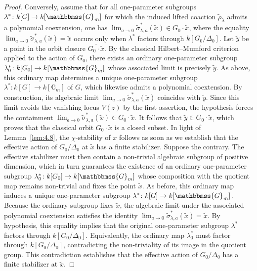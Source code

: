 \documentclass[11pt,a4paper,reqno,noamsfonts]{amsart}
\numberwithin{equation}{section}
\theoremstyle{definition}
\theoremstyle{remark}
\newcommand{\GG}{\ensuremath{\mathbbmss{G}}}
\begin{document}
\begin{proof}
Conversely, assume that for all one-parameter subgroups $\lambda^* \colon k[G] \to k[\GG_m]$ for which the induced lifted coaction $\tilde{\rho}_{\lambda}$ admits a polynomial coextension, one has $\displaystyle \lim_{a \to 0} \tilde{\sigma}_{\lambda,a}^*(\tilde{x}) \in G_0 \cdot \tilde{x}$, where the equality $\displaystyle \lim_{a \to 0} \tilde{\sigma}_{\lambda,a}^*(\tilde{x}) = \tilde{x}$ occurs only when $\lambda^*$ factors through $k[G_0/\Delta_0]$. Let $\tilde{y}$ be a point in the orbit closure $\overline{G_0 \cdot \tilde{x}}$. By the classical Hilbert--Mumford criterion applied to the action of $G_0$, there exists an ordinary one-parameter subgroup $\lambda_0^* \colon k[G_0] \to k[\GG_m]$ whose associated limit is precisely $\tilde{y}$. As above, this ordinary map determines a unique one-parameter subgroup $\lambda^* \colon k[G] \to k[\mathbb{G}_m]$ of $G$, which likewise admits a polynomial coextension. By construction, its algebraic limit $\displaystyle \lim_{a \to 0} \tilde{\sigma}_{\lambda,a}^*(\tilde{x})$ coincides with $\tilde{y}$. Since this limit avoids the vanishing locus $V(z)$ by the first assertion, the hypothesis forces the containment $\displaystyle \lim_{a \to 0} \tilde{\sigma}_{\lambda,a}^*(\tilde{x}) \in G_0 \cdot \tilde{x}$. It follows that $\tilde{y} \in G_0 \cdot \tilde{x}$, which proves that the classical orbit $G_0 \cdot \tilde{x}$ is a closed subset. In light of Lemma~\ref{lem:4.8}, the $\chi$-stability of $x$ follows as soon as we establish that the effective action of $G_0/\Delta_0$ at $\tilde{x}$ has a finite stabilizer. Suppose the contrary. The effective stabilizer must then contain a non-trivial algebraic subgroup of positive dimension, which in turn guarantees the existence of an ordinary one-parameter subgroup $\lambda_0^* \colon k[G_0] \to k[\GG_m]$ whose composition with the quotient map remains non-trivial and fixes the point $\tilde{x}$. As before, this ordinary map induces a unique one-parameter subgroup $\lambda^* \colon k[G] \to k[\GG_m]$. Because the ordinary subgroup fixes $\tilde{x}$, the algebraic limit under the associated polynomial coextension satisfies the identity $\displaystyle \lim_{a \to 0} \tilde{\sigma}_{\lambda,a}^*(\tilde{x}) = \tilde{x}$. By hypothesis, this equality implies that the original one-parameter subgroup $\lambda^*$ factors through $k[G_0/\Delta_0]$. Equivalently, the ordinary map $\lambda_0^*$ must factor through $k[G_0/\Delta_0]$, contradicting the non-triviality of its image in the quotient group. This contradiction establishes that the effective action of $G_0/\Delta_0$ has a finite stabilizer at $\tilde{x}$. 
\end{proof}
\end{document}
